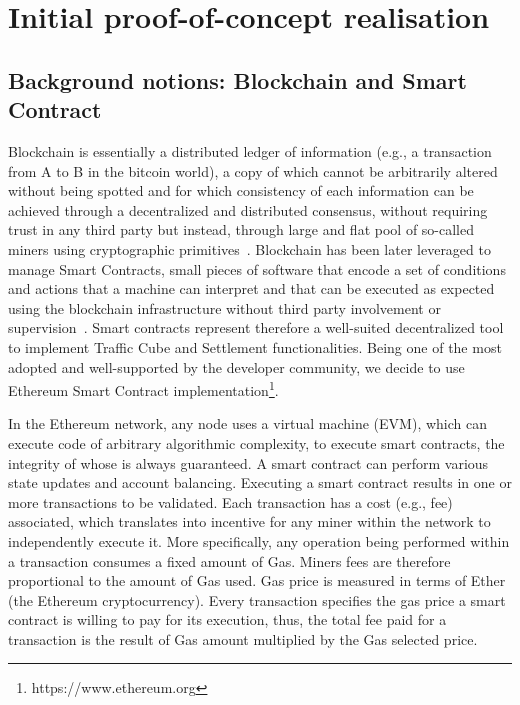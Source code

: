 \section{Initial proof-of-concept realisation}  \label{eq:realisation}


\subsection{Background notions: Blockchain and Smart Contract}  \label{sec:blockchain}
Blockchain is essentially a distributed ledger of information (e.g., a transaction from A to B in the bitcoin world), a copy of which cannot be arbitrarily altered without being spotted and for which consistency of each information can be achieved through a decentralized and distributed consensus, without requiring trust in any third party but instead, through large and flat pool of so-called miners using cryptographic primitives~\cite{nakamoto2008bitcoin}.
Blockchain has been later leveraged to manage Smart Contracts, small pieces of software that encode a set of conditions and actions that a machine can interpret and that can be executed as expected using the blockchain infrastructure without third party involvement or supervision~\cite{Buterin2014}. Smart contracts represent therefore a well-suited decentralized tool to implement Traffic Cube and Settlement functionalities. Being one of the most adopted and well-supported by the developer community, we decide to use Ethereum Smart Contract implementation\footnote{https://www.ethereum.org}.

In the Ethereum network, any node uses a virtual machine (EVM), which can execute code of arbitrary algorithmic complexity, to execute smart contracts, the integrity of whose is always guaranteed. A smart contract can perform various state updates and account balancing.  
Executing a smart contract results in one or more transactions to be validated. Each transaction has a cost (e.g., fee) associated, which translates into incentive for any miner within the network to independently execute it. 
More specifically, any operation being performed within a transaction consumes a fixed amount of Gas. Miners fees are therefore proportional to the amount of Gas used. Gas price is measured in terms of Ether (the Ethereum cryptocurrency). Every transaction specifies the gas price a smart contract is willing to pay for its execution, thus, the total fee paid for a transaction is the result of Gas amount multiplied by the Gas selected price.

